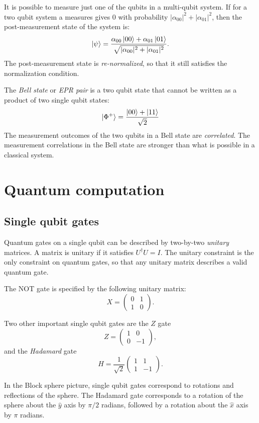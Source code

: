 It is possible to measure just one of the qubits in a multi-qubit system.
If for a two qubit system a measures gives \num{0} with probability $|\alpha_{00}|^2 + |\alpha_{01}|^2$,
then the post-measurement state of the system is:
\[
    \ket{\psi} = \frac{\alpha_{00} \ket{00} + \alpha_{01} \ket{01}}{\sqrt{|\alpha_{00}|^2 + |\alpha_{01}|^2}}.
\]
The post-measurement state is \emph{re-normalized}, so that it still satisfies the normalization condition.

The \emph{Bell state} or \emph{EPR pair} is a two qubit state that cannot be written as a product of two single qubit states:
\[
    \ket{\Phi^+} = \frac{\ket{00} + \ket{11}}{\sqrt{2}}
\]
The measurement outcomes of the two qubits in a Bell state are \emph{correlated}.
The measurement correlations in the Bell state are stronger than what is possible in a classical system.

\section{Quantum computation}

\subsection{Single qubit gates}

Quantum gates on a single qubit can be described by two-by-two \emph{unitary} matrices.
A matrix is unitary if it satisfies $U^\dagger U = I$.
The unitary constraint is the only constraint on quantum gates,
so that any unitary matrix describes a valid quantum gate.

The NOT gate is specified by the following unitary matrix:
\[
    X = \begin{pmatrix}
        0 & 1 \\
        1 & 0
    \end{pmatrix}.
\]

Two other important single qubit gates are the $Z$ gate
\[
    Z = \begin{pmatrix}
        1 & 0 \\
        0 & -1
    \end{pmatrix},
\]
and the \emph{Hadamard} gate
\[
    H = \frac{1}{\sqrt{2}} \begin{pmatrix}
        1 & 1 \\
        1 & -1
    \end{pmatrix}.
\]

In the Block sphere picture, single qubit gates correspond to rotations and reflections of the sphere.
The Hadamard gate corresponds to a rotation of the sphere about the $\hat{y}$ axis by $\pi/2$ radians,
followed by a rotation about the $\hat{x}$ axis by $\pi$ radians.


